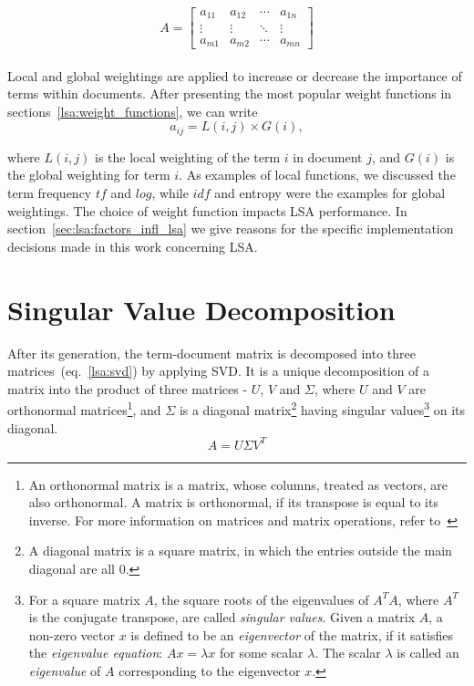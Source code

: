 %
%
\begin{equation}
A=
\begin{bmatrix}
\label{lsa:sparse_matrix_A}
 a_{11}& a_{12}& \cdots& a_{1n} \\
 \vdots& \vdots& \ddots& \vdots \\ 
 a_{m1}& a_{m2}& \cdots& a_{mn}
\end{bmatrix}
\end{equation}\\

Local and global weightings are applied to increase or decrease the importance of terms within documents. After presenting the most popular weight functions in sections~\ref{lsa:weight_functions}, we can write
%
%
\begin{equation}
\label{lsa:global_local_weighting}
a_{ij}=L(i,j) \times G(i),
\end{equation}

where $L(i,j)$ is the local weighting of the term $i$ in document $j$, and $G(i)$ is the global weighting for term $i$. As examples of local functions, we discussed the term frequency $tf$ and $log$, while $idf$ and entropy were the examples for global weightings. The choice of weight function impacts \gls{LSA} performance. In section~\ref{sec:lsa:factors_infl_lsa} we give reasons for the specific implementation decisions made in this work concerning \gls{LSA}. \\

\section{Singular Value Decomposition}
\label{sec:lsa:svd}

After its generation, the term-document matrix is decomposed into three matrices~(eq.~\ref{lsa:svd}) by applying \gls{SVD}. It is a unique decomposition of a matrix into the product of three matrices - $U$, $V$ and $\Sigma$, where $U$ and $V$ are orthonormal matrices\footnote{An orthonormal matrix is a matrix, whose columns, treated as 
 vectors, are also orthonormal. A matrix is orthonormal, if its transpose is equal to its inverse. For more information on matrices and matrix operations, refer to~\cite{MatrixCompGolub96}}, and $ \Sigma $ is a diagonal matrix\footnote{A diagonal matrix is a square matrix, in which the entries outside the main diagonal are all $0$.} having singular values\footnote{For a square matrix $A$, the square roots of the eigenvalues of $A^{T}A$, where $A^{T}$ is the conjugate transpose, are called \textit{singular values}. Given a matrix $A$, a non-zero vector $x$ is defined to be an \textit{eigenvector} of the matrix, if it satisfies the \textit{eigenvalue equation}: $Ax=\lambda x$ for some scalar $ \lambda $. The scalar $ \lambda $ is called an \textit{eigenvalue} of $A$ corresponding to the eigenvector $x$.\cite{MatrixCompGolub96}} on its diagonal.\\
%
%
\begin{equation}
\label{lsa:svd}
A=U \Sigma V^{T}
\end{equation}

